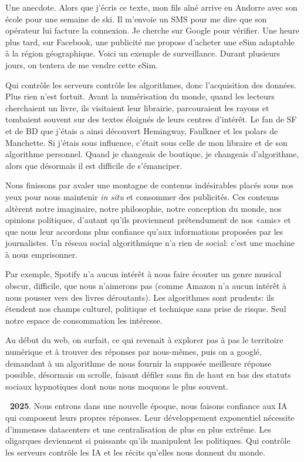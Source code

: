 \documentclass[a5paper, 10pt, twoside]{book}
\begin{document}
Une anecdote. Alors que j’écris ce texte, mon fils aîné arrive en
Andorre avec son école pour une semaine de ski. Il m’envoie un SMS pour
me dire que son opérateur lui facture la connexion. Je cherche sur
Google pour vérifier. Une heure plus tard, sur Facebook, une publicité
me propose d’acheter une eSim adaptable à la région géographique. Voici
un exemple de surveillance. Durant plusieurs jours, on tentera de me
vendre cette eSim.

Qui contrôle les serveurs contrôle les algorithmes, donc l’acquisition
des données. Plus rien n’est fortuit. Avant la numérisation du monde,
quand les lecteurs cherchaient un livre, ils visitaient leur librairie,
parcouraient les rayons et tombaient souvent sur des textes éloignés de
leurs centres d’intérêt. Le fan de SF et de BD que j’étais a ainsi
découvert Hemingway, Faulkner et les polars de Manchette. Si j’étais
sous influence, c’était sous celle de mon libraire et de son algorithme
personnel. Quand je changeais de boutique, je changeais d’algorithme,
alors que désormais il est difficile de s’émanciper.

Nous finissons par avaler une montagne de contenus indésirables placés
sous nos yeux pour nous maintenir \emph{in situ} et consommer des
publicités. Ces contenus altèrent notre imaginaire, notre philosophie,
notre conception du monde, nos opinions politiques, d’autant qu’ils
proviennent prétendument de nos «amis» et que nous leur accordons plus
confiance qu’aux informations proposées par les journalistes. Un réseau
social algorithmique n’a rien de social: c’est une machine à nous
emprisonner.

Par exemple, Spotify n’a aucun intérêt à nous faire écouter un genre
musical obscur, difficile, que nous n’aimerons pas (comme Amazon n’a
aucun intérêt à nous pousser vers des livres déroutants). Les
algorithmes sont prudents: ils étendent nos champs culturel, politique
et technique sans prise de risque. Seul notre espace de consommation les
intéresse.

Au début du web, on surfait, ce qui revenait à explorer pas à pas le
territoire numérique et à trouver des réponses par nous-mêmes, puis on a
googlé, demandant à un algorithme de nous fournir la supposée meilleure
réponse possible, désormais on scrolle, faisant défiler sans fin de haut
en bas des statuts sociaux hypnotiques dont nous nous moquons le plus
souvent.

\textbf{~2025}. Nous entrons dans une nouvelle époque, nous faisons
confiance aux IA qui composent leurs propres réponses. Leur
développement exponentiel nécessite d’immenses datacenters et une
centralisation de plus en plus extrême. Les oligarques deviennent si
puissants qu’ils manipulent les politiques. Qui contrôle les serveurs
contrôle les IA et les récits qu’elles nous donnent du monde.
\end{document}
